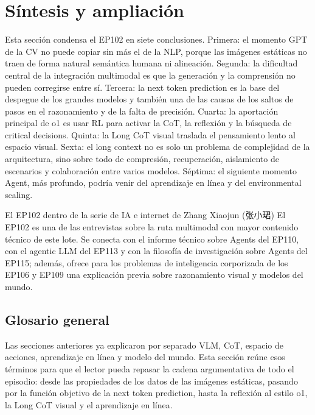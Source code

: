 \section{Síntesis y ampliación}

Esta sección condensa el EP102 en siete conclusiones. Primera: el momento GPT de la CV no puede copiar sin más el de la NLP, porque las imágenes estáticas no traen de forma natural semántica humana ni alineación. Segunda: la dificultad central de la integración multimodal es que la generación y la comprensión no pueden corregirse entre sí. Tercera: la next token prediction es la base del despegue de los grandes modelos y también una de las causas de los saltos de pasos en el razonamiento y de la falta de precisión. Cuarta: la aportación principal de o1 es usar RL para activar la CoT, la reflexión y la búsqueda de critical decisions. Quinta: la Long CoT visual traslada el pensamiento lento al espacio visual. Sexta: el long context no es solo un problema de complejidad de la arquitectura, sino sobre todo de compresión, recuperación, aislamiento de escenarios y colaboración entre varios modelos. Séptima: el siguiente momento Agent, más profundo, podría venir del aprendizaje en línea y del environmental scaling.

\begin{importantbox}{El EP102 dentro de la serie de IA e internet de Zhang Xiaojun (张小珺)}
El EP102 es una de las entrevistas sobre la ruta multimodal con mayor contenido técnico de este lote. Se conecta con el informe técnico sobre Agents del EP110, con el agentic LLM del EP113 y con la filosofía de investigación sobre Agents del EP115; además, ofrece para los problemas de inteligencia corporizada de los EP106 y EP109 una explicación previa sobre razonamiento visual y modelos del mundo.
\end{importantbox}

\subsection{Glosario general}

Las secciones anteriores ya explicaron por separado VLM, CoT, espacio de acciones, aprendizaje en línea y modelo del mundo. Esta sección reúne esos términos para que el lector pueda repasar la cadena argumentativa de todo el episodio: desde las propiedades de los datos de las imágenes estáticas, pasando por la función objetivo de la next token prediction, hasta la reflexión al estilo o1, la Long CoT visual y el aprendizaje en línea.


